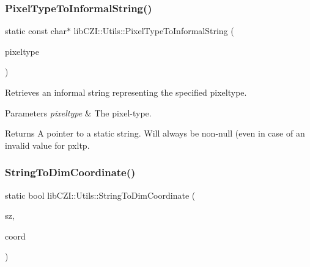 \subsubsection{\texorpdfstring{Pixel\+Type\+To\+Informal\+String()}{PixelTypeToInformalString()}}
{\footnotesize\ttfamily static const char$\ast$ lib\+C\+Z\+I\+::\+Utils\+::\+Pixel\+Type\+To\+Informal\+String (\begin{DoxyParamCaption}\item[{\hyperlink{namespacelib_c_z_i_abf8ce12ab88b06c8b3b47efbb5e2e834}{lib\+C\+Z\+I\+::\+Pixel\+Type}}]{pixeltype }\end{DoxyParamCaption})\hspace{0.3cm}{\ttfamily [static]}}

Retrieves an informal string representing the specified pixeltype.


\begin{DoxyParams}{Parameters}
{\em pixeltype} & The pixel-\/type.\\
\hline
\end{DoxyParams}
\begin{DoxyReturn}{Returns}
A pointer to a static string. Will always be non-\/null (even in case of an invalid value for {\ttfamily pxltp}. 
\end{DoxyReturn}
\mbox{\label{classlib_c_z_i_1_1_utils_a3c3cf0e18a7588ff708bf279db79db95}} 
\subsubsection{\texorpdfstring{String\+To\+Dim\+Coordinate()}{StringToDimCoordinate()}}
{\footnotesize\ttfamily static bool lib\+C\+Z\+I\+::\+Utils\+::\+String\+To\+Dim\+Coordinate (\begin{DoxyParamCaption}\item[{const char $\ast$}]{sz,  }\item[{\hyperlink{classlib_c_z_i_1_1_c_dim_coordinate}{lib\+C\+Z\+I\+::\+C\+Dim\+Coordinate} $\ast$}]{coord }\end{DoxyParamCaption})\hspace{0.3cm}{\ttfamily [static]}}

